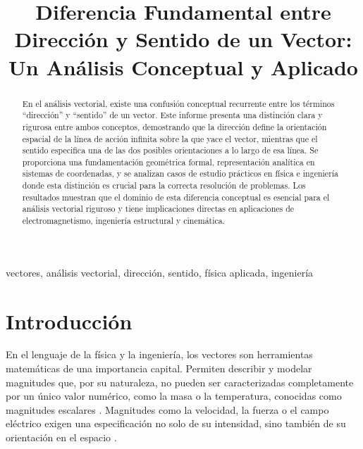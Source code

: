 \documentclass[conference]{IEEEtran}
\begin{document}
\title{Diferencia Fundamental entre Dirección y Sentido de un Vector: Un Análisis Conceptual y Aplicado}

\author{
}

\maketitle

\begin{abstract}
En el análisis vectorial, existe una confusión conceptual recurrente entre los términos ``dirección'' y ``sentido'' de un vector. Este informe presenta una distinción clara y rigurosa entre ambos conceptos, demostrando que la dirección define la orientación espacial de la línea de acción infinita sobre la que yace el vector, mientras que el sentido especifica una de las dos posibles orientaciones a lo largo de esa línea. Se proporciona una fundamentación geométrica formal, representación analítica en sistemas de coordenadas, y se analizan casos de estudio prácticos en física e ingeniería donde esta distinción es crucial para la correcta resolución de problemas. Los resultados muestran que el dominio de esta diferencia conceptual es esencial para el análisis vectorial riguroso y tiene implicaciones directas en aplicaciones de electromagnetismo, ingeniería estructural y cinemática.
\end{abstract}

\begin{IEEEkeywords}
vectores, análisis vectorial, dirección, sentido, física aplicada, ingeniería
\end{IEEEkeywords}

\section{Introducción}

En el lenguaje de la física y la ingeniería, los vectores son herramientas matemáticas de una importancia capital. Permiten describir y modelar magnitudes que, por su naturaleza, no pueden ser caracterizadas completamente por un único valor numérico, como la masa o la temperatura, conocidas como magnitudes escalares \cite{grossman2012algebra}. Magnitudes como la velocidad, la fuerza o el campo eléctrico exigen una especificación no solo de su intensidad, sino también de su orientación en el espacio \cite{grossman2012algebra}.
\end{document}
